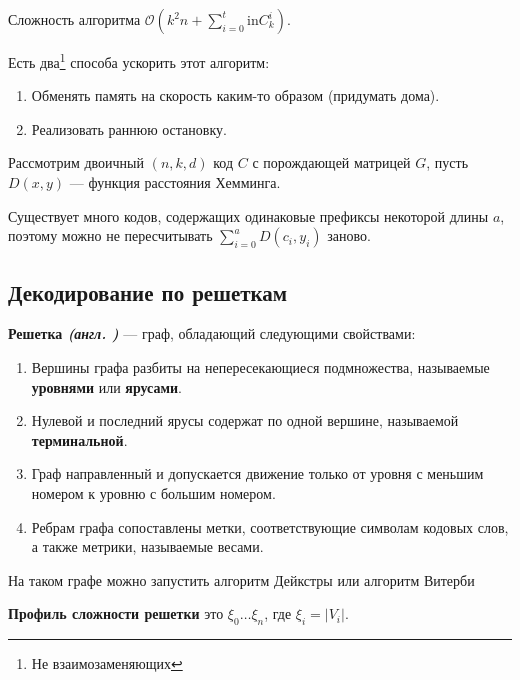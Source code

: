 Сложность алгоритма \(\mathcal{O}\left(k^2 n + \sum_{i=0}^{t} \mathrm{in} C_k^i\right)\).

Есть два\footnote{Не взаимозаменяющих} способа ускорить этот алгоритм:
\begin{enumerate}
    \item Обменять память на скорость каким-то образом (придумать дома).
    \item Реализовать раннюю остановку. %
\end{enumerate}

Рассмотрим двоичный \((n, k, d)\) код \(C\) с порождающей матрицей \(G\), пусть \(D(x, y)\) --- функция расстояния Хемминга.

Существует много кодов, содержащих одинаковые префиксы некоторой длины \(a\),
поэтому можно не пересчитывать \(\sum_{i=0}^{a} D(c_i, y_i)\) заново.

\unfinished

\subsection{Декодирование по решеткам}

\begin{definition}
    \textbf{Решетка \textit{(англ. \?)}} --- граф, обладающий следующими свойствами:
    \begin{enumerate}
        \item Вершины графа разбиты на непересекающиеся подмножества, называемые \textbf{уровнями} или \textbf{ярусами}.
        \item Нулевой и последний ярусы содержат по одной вершине, называемой \textbf{терминальной}.
        \item Граф направленный и допускается движение только от уровня с меньшим номером к уровню с большим номером.
        \item Ребрам графа сопоставлены метки, соответствующие символам кодовых слов,
        а также метрики, называемые весами.
    \end{enumerate}
\end{definition}

На таком графе можно запустить алгоритм Дейкстры или алгоритм Витерби %

\begin{definition}
    \textbf{Профиль сложности решетки} это \(\xi_0 \dots \xi_n\), где \(\xi_i = |V_i|\).
\end{definition}

